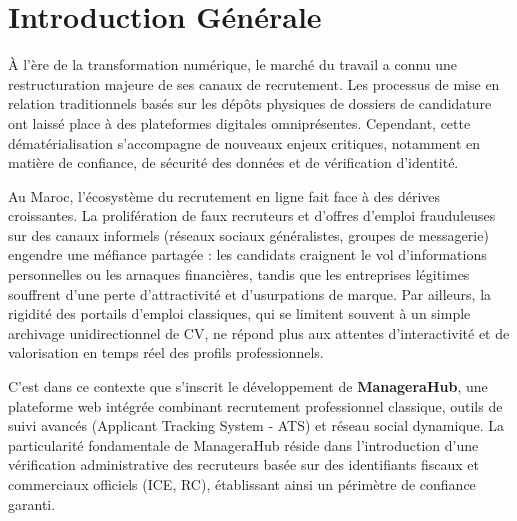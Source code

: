 \chapter*{Introduction Générale}

À l'ère de la transformation numérique, le marché du travail a connu une restructuration majeure de ses canaux de recrutement. Les processus de mise en relation traditionnels basés sur les dépôts physiques de dossiers de candidature ont laissé place à des plateformes digitales omniprésentes. Cependant, cette dématérialisation s'accompagne de nouveaux enjeux critiques, notamment en matière de confiance, de sécurité des données et de vérification d'identité.

Au Maroc, l'écosystème du recrutement en ligne fait face à des dérives croissantes. La prolifération de faux recruteurs et d'offres d'emploi frauduleuses sur des canaux informels (réseaux sociaux généralistes, groupes de messagerie) engendre une méfiance partagée : les candidats craignent le vol d'informations personnelles ou les arnaques financières, tandis que les entreprises légitimes souffrent d'une perte d'attractivité et d'usurpations de marque. Par ailleurs, la rigidité des portails d'emploi classiques, qui se limitent souvent à un simple archivage unidirectionnel de CV, ne répond plus aux attentes d'interactivité et de valorisation en temps réel des profils professionnels.

C'est dans ce contexte que s'inscrit le développement de \textbf{ManageraHub}, une plateforme web intégrée combinant recrutement professionnel classique, outils de suivi avancés (Applicant Tracking System - ATS) et réseau social dynamique. La particularité fondamentale de ManageraHub réside dans l'introduction d'une vérification administrative des recruteurs basée sur des identifiants fiscaux et commerciaux officiels (ICE, RC), établissant ainsi un périmètre de confiance garanti.

